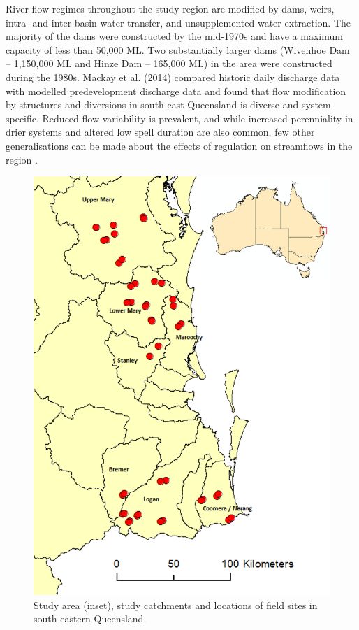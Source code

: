 \documentclass[openright,12pt,a4paper]{memoir}
\begin{document}
River flow regimes throughout the study region are modified by dams, weirs, intra- and inter-basin water transfer, and unsupplemented water extraction. The majority of the dams were constructed by the mid-1970s and have a maximum capacity of less than 50,000 ML. Two substantially larger dams (Wivenhoe Dam – 1,150,000 ML and Hinze Dam – 165,000 ML) in the area were constructed during the 1980s. Mackay et al. (2014) compared historic daily discharge data with modelled predevelopment discharge data and found that flow modification by structures and diversions in south-east Queensland is diverse and system specific. Reduced flow variability is prevalent, and while increased perenniality in drier systems and altered low spell duration are also common, few other generalisations can be made about the effects of regulation on streamflows in the region \citep{Mackay2014}.

\begin{figure}[h!]
\begin{center}
\includegraphics[width=12cm,keepaspectratio=true]{Ch4map2.png} %
\caption[Study catchments and locations of field sites in south-eastern Queensland.]{\small{Study area (inset), study catchments and locations of field sites in south-eastern Queensland.}} %
\label{fig:Ch4_F1} %
\end{center}
\end{figure}   
\end{document}
